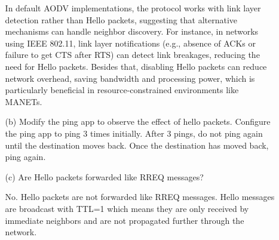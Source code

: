\documentclass[a4paper]{article}
\begin{document}
\begin{enumerate}
\begin{itemize}
				In default AODV implementations, the protocol works with link layer detection rather than Hello packets, suggesting that alternative mechanisms can handle neighbor discovery. For instance, in networks using IEEE 802.11, link layer notifications (e.g., absence of ACKs or failure to get CTS after RTS) can detect link breakages, reducing the need for Hello packets. Besides that, disabling Hello packets can reduce network overhead, saving bandwidth and processing power, which is particularly beneficial in resource-constrained environments like MANETs.
				
				\pagebreak
				
				\item[(b)] Modify the ping app to observe the effect of hello packets. Configure the ping app to ping 3 times initially.
				After 3 pings, do not ping again until the destination moves back. Once the destination has moved back, ping
				again.
				
				
				
				\item[(c)] Are Hello packets forwarded like RREQ messages?
				
				No.
				Hello packets are not forwarded like RREQ messages.
				Hello messages are broadcast with TTL=1 which means they are only received by immediate neighbors and are not propagated further through the network.
				
			\end{itemize}
			
		\end{enumerate}
		
		
		
\end{document}
